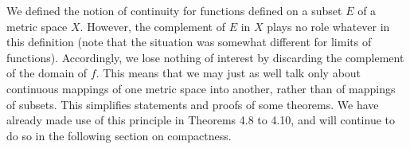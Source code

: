 We defined the notion of continuity for functions defined on a subset $E$ of
a metric space $X$. However, the complement of $E$ in $X$ plays no role
whatever in this definition (note that the situation was somewhat different
for limits of functions). Accordingly, we lose nothing of interest by
discarding the complement of the domain of $f$. This means that we may just
as well talk only about continuous mappings of one metric space into another,
rather than of mappings of subsets. This simplifies statements and proofs of
some theorems. We have already made use of this principle in Theorems 4.8 to
4.10, and will continue to do so in the following section on
compactness.
